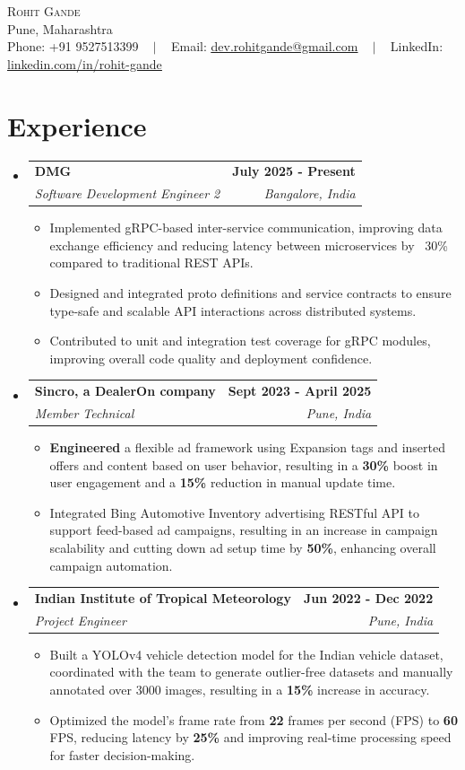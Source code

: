 \documentclass[letterpaper,11pt]{article}
\makeatletter
\newcommand{\resumeItem}[1]{
  \item\small{
	{#1 \vspace{-2pt}}
  }
}
\newcommand{\resumeSubheading}[4]{
  \vspace{-2pt}\item
	\begin{tabular*}{1.0\textwidth}[t]{l@{\extracolsep{\fill}}r}
  	\textbf{#1} & \textbf{\small #2} \\
  	\textit{\small#3} & \textit{\small #4} \\
	\end{tabular*}\vspace{-7pt}
}
\newcommand{\resumeSubHeadingListStart}{\begin{itemize}[leftmargin=0.0in, label={}]}
\newcommand{\resumeSubHeadingListEnd}{\end{itemize}}
\newcommand{\resumeItemListStart}{\begin{itemize}}
\newcommand{\resumeItemListEnd}{\end{itemize}\vspace{-5pt}}
\makeatother
\begin{document}
\begin{center}
	{\Huge \scshape Rohit Gande} \\ \vspace{1pt}
	Pune, Maharashtra \\ \vspace{1pt}
	\small Phone: +91 9527513399 ~ $|$ ~ Email: \href{mailto:dev.rohitgande@gmail.com}{\underline{dev.rohitgande@gmail.com}} ~ $|$ ~
	LinkedIn: \href{https://linkedin.com/in/rohit-gande}{\underline{linkedin.com/in/rohit-gande}}
	\vspace{-8pt}
\end{center}

\section{Experience}
  \resumeSubHeadingListStart
  	\resumeSubheading
  	{DMG}{July 2025 - Present}
  	{Software Development Engineer 2}{Bangalore, India}
  	\resumeItemListStart
    	\resumeItem{Implemented gRPC-based inter-service communication, improving data exchange efficiency and reducing latency between microservices by ~30\% compared to traditional REST APIs.}
    	\resumeItem{Designed and integrated proto definitions and service contracts to ensure type-safe and scalable API interactions across distributed systems.}
        \resumeItem{Contributed to unit and integration test coverage for gRPC modules, improving overall code quality and deployment confidence.}
	\resumeItemListEnd
	\resumeSubheading
  	{Sincro, a DealerOn company}{Sept 2023 - April 2025}
  	{Member Technical}{Pune, India}
  	\resumeItemListStart
    	\resumeItem{\textbf{Engineered} a flexible ad framework using Expansion tags and inserted offers and content based on user behavior, resulting in a \textbf{30\%} boost in user engagement and a \textbf{15\%} reduction in manual update time.}
    	\resumeItem{Integrated Bing Automotive Inventory advertising RESTful API to support feed-based ad campaigns, resulting in an increase in campaign scalability and cutting down ad setup time by \textbf{50\%}, enhancing overall campaign automation.}
	\resumeItemListEnd
    \resumeSubheading
  	{Indian Institute of Tropical Meteorology}{Jun 2022 - Dec 2022}
  	{Project Engineer}{Pune, India}
  	\resumeItemListStart
    	\resumeItem{Built a YOLOv4 vehicle detection model for the Indian vehicle dataset, coordinated with the team to generate outlier-free datasets and manually annotated over 3000 images, resulting in a \textbf{15\%} increase in accuracy.}
    	\resumeItem{Optimized the model's frame rate from \textbf{22} frames per second (FPS) to \textbf{60} FPS, reducing latency by \textbf{25\%} and improving real-time processing speed for faster decision-making.}
	\resumeItemListEnd
  \resumeSubHeadingListEnd
\vspace{-16pt}
\end{document}
